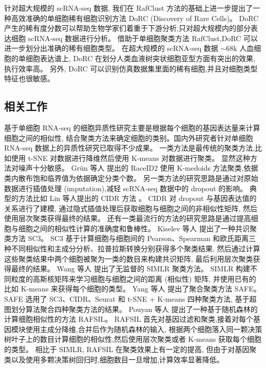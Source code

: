 针对超大规模的 scRNA-seq 数据, 我们在 RafClust 方法的基础上进一步提出了一种高效准确的单细胞稀有细胞识别方法 DoRC (Discovery of Rare Cells)。
DoRC 产生的稀有度分数可以帮助生物学家们着重于下游分析,只对超大规模内的部分表达细胞 scRNA-seq 数据进行分析。
借助于单细胞聚类方法 RafClust,DoRC 可以进一步划分出准确的稀有细胞类型。
在超大规模的 scRNA-seq 数据 ${\sim}68$k 人血细胞的单细胞表达谱上,
 DoRC 在划分人类血液树突状细胞亚型方面有突出的效果, 执行效率高。
另外, DoRC 可以识别仿真数据集里面的稀有细胞,并且对细胞类型特征也很敏感。

\subsection{相关工作}

基于单细胞 RNA-seq 的细胞异质性研究主要是根据每个细胞的基因表达量来计算细胞之间的相似性,
结合聚类方法来确定细胞的类别。国内外研究者针对单细胞 RNA-seq 数据上的异质性研究已取得不少成果。
一类方法是最传统的聚类方法,比如使用 t-SNE 对数据进行降维然后使用 K-means 对数据进行聚类。
显然这种方法对噪声十分敏感。
Gr{\"u}n 等人  提出的 RaceID2 
使用 K-medoids 方法聚类,依据类内散布饱和临界值为依据确定分类个数。
另一类方法的研究思路是通过对原始数据进行插值处理 (imputation),减轻 scRNA-seq 数据中的 dropout 的影响。
典型的方法比如 Lin 等人提出的 CIDR 方法 。
CIDR 对 dropout 与基因表达值的关系进行了建模, 通过隐式插值处理后获取细胞与细胞之间的非相似性矩阵,
然后使用层次聚类获得最终的结果。
还有一类最流行的方法的研究思路是通过提高细胞与细胞之间的相似性计算的准确度和鲁棒性。
Kiselev 等人  提出了一种共识聚类方法 SC3。
SC3 基于计算细胞与细胞间的 Pearson、Spearman 和欧氏距离三种不同相似性和主成分分析、拉普拉斯转换分别获得多个聚类结果,
然后通过计算这些聚类结果中两个细胞被聚为一类的数目来构建共识矩阵,
最后利用层次聚类获得最终的结果。
Wang 等人  提出了无监督的 SIMLR 聚类方法。
SIMLR 构建不同粒度的高斯核矩阵来学习细胞与细胞之间的距离 (相似性) 矩阵,
并使用已有的比如 K-means 来获得每个细胞的类型。
Yang 等人  提出了聚合聚类方法 SAFE。
SAFE 选用了 SC3、CIDR、Seurat 和 t-SNE + K-means 四种聚类方法,
基于超图划分算法聚合四种聚类方法的结果。
Pouyan 等人  提出了一种基于随机森林的计算细胞相似性的方法 RAFSIL。
RAFSIL 首先对基因过滤和聚类,接着对每个基因模块使用主成分降维,合并后作为随机森林的输入,
根据两个细胞落入同一颗决策树叶子上的数目计算细胞的相似性,然后使用层次聚类或者 K-means 获取每个细胞的类型。
相比于 SIMLR, RAFSIL 在聚类效果上有一定的提高,
但由于对基因聚类以及使用多颗决策树回归时,细胞数目一旦增加,计算效率显著降低。

